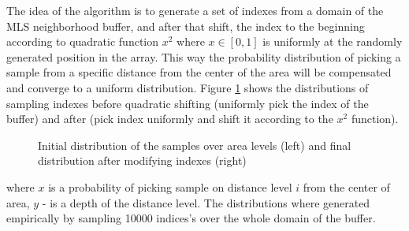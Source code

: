 The idea of the algorithm is to generate a set of indexes from a domain of the MLS neighborhood buffer, and after that shift, the index to the beginning according to quadratic function $x^2$ where $x\in [0,1]$ is uniformly at the randomly generated position in the array. This way the probability distribution of picking a sample from a specific distance from the center of the area will be compensated and converge to a uniform distribution. Figure \ref{fig:distributions} shows the distributions of sampling indexes before quadratic shifting (uniformly pick the index of the buffer) and after (pick index uniformly and shift it according to the $x^2$ function).\\
\begin{figure}
	\caption{Initial distribution of the samples over area levels (left) and final distribution after modifying indexes (right)}
	\label{fig:distributions}
\end{figure}
where $x$ is a probability of picking sample on distance level $i$ from the center of area, $y$ - is a depth of the distance level. The distributions where generated empirically by sampling 10000 indices's over the whole domain of the buffer. 
